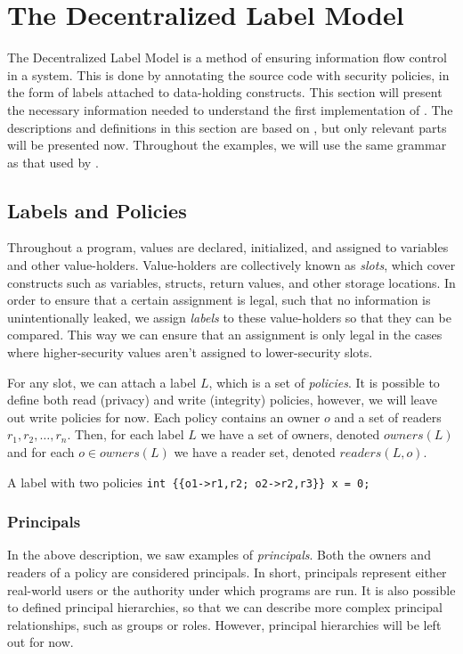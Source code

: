 
\section{The Decentralized Label Model}
The Decentralized Label Model \cite{myers1997, myers1998, myers2000} is a method of ensuring information flow control in a system.
This is done by annotating the source code with security policies, in the form of labels attached to data-holding constructs.
This section will present the necessary information needed to understand the first implementation of \thetool.
The descriptions and definitions in this section are based on \cite{myers1997, myers1998, myers2000}, but only relevant parts will be presented now.
Throughout the examples, we will use the same grammar as that used by \thetool.

\subsection{Labels and Policies}
Throughout a program, values are declared, initialized, and assigned to variables and other value-holders.
Value-holders are collectively known as \emph{slots}, which cover constructs such as variables, structs, return values, and other storage locations.
In order to ensure that a certain assignment is legal, such that no information is unintentionally leaked, we assign \emph{labels} to these value-holders so that they can be compared.
This way we can ensure that an assignment is only legal in the cases where higher-security values aren't assigned to lower-security slots.

For any slot, we can attach a label $L$, which is a set of \emph{policies}.
It is possible to define both read (privacy) and write (integrity) policies, however, we will leave out write policies for now.
Each policy contains an owner $o$ and a set of readers $r_1,r_2,\dots,r_n$.
Then, for each label $L$ we have a set of owners, denoted $owners(L)$ and for each $o \in owners(L)$ we have a reader set, denoted $readers(L, o)$.

\begin{example}{A label with two policies}\label{dlm:ex:simple_label}
  \texttt{int \{\{o1->r1,r2; o2->r2,r3\}\} x = 0;}
\end{example}

\subsubsection{Principals}
In the above description, we saw examples of \textit{principals}.
Both the owners and readers of a policy are considered principals.
In short, principals represent either real-world users or the authority under which programs are run.
It is also possible to defined principal hierarchies, so that we can describe more complex principal relationships, such as groups or roles.
However, principal hierarchies will be left out for now.

